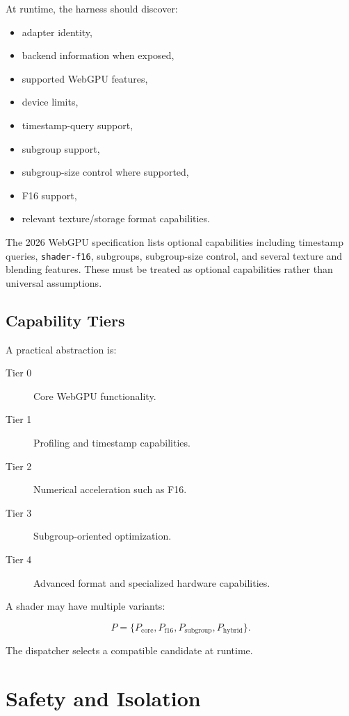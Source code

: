 \documentclass[11pt,a4paper,oneside]{report}
\begin{document}
At runtime, the harness should discover:

\begin{itemize}
  \item adapter identity,
  \item backend information when exposed,
  \item supported WebGPU features,
  \item device limits,
  \item timestamp-query support,
  \item subgroup support,
  \item subgroup-size control where supported,
  \item F16 support,
  \item relevant texture/storage format capabilities.
\end{itemize}

The 2026 WebGPU specification lists optional capabilities including timestamp queries,
\texttt{shader-f16}, subgroups, subgroup-size control, and several texture and blending features.
These must be treated as optional capabilities rather than universal assumptions.

\section{Capability Tiers}

A practical abstraction is:

\begin{description}
  \item[Tier 0] Core WebGPU functionality.
  \item[Tier 1] Profiling and timestamp capabilities.
  \item[Tier 2] Numerical acceleration such as F16.
  \item[Tier 3] Subgroup-oriented optimization.
  \item[Tier 4] Advanced format and specialized hardware capabilities.
\end{description}

A shader may have multiple variants:

\[
P =
\{P_{\mathrm{core}},
P_{\mathrm{f16}},
P_{\mathrm{subgroup}},
P_{\mathrm{hybrid}}\}.
\]

The dispatcher selects a compatible candidate at runtime.

\chapter{Safety and Isolation}
\end{document}
